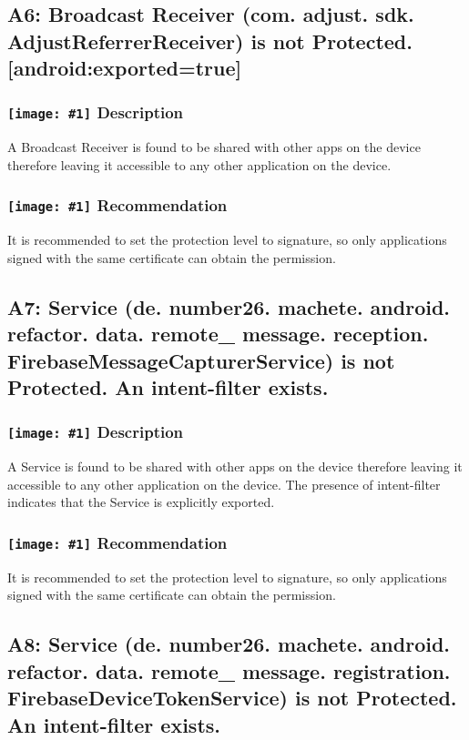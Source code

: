 \documentclass[12p]{article}
\newcommand{\icon}[1]{\texttt{[image: \#1]}}
\begin{document}
\subsection{A6: Broadcast Receiver (com. adjust. sdk. AdjustReferrerReceiver) is not Protected. [android:exported=true]}
\subsubsection*{\protect\icon{/home/miki/Documents/GITHUB/AndroidPermissions/python/vulns/report_icons/basic_sheet.png} Description}
A Broadcast Receiver is found to be shared with other apps on the device therefore leaving it accessible to any other application on the device.
\subsubsection*{\protect\icon{/home/miki/Documents/GITHUB/AndroidPermissions/python/vulns/report_icons/basic_todo.png} Recommendation}
It is recommended to set the protection level to signature, so only applications signed with the same certificate can obtain the permission.
\subsection{A7: Service (de. number26. machete. android. refactor. data. remote\_ message. reception. FirebaseMessageCapturerService) is not Protected. An intent-filter exists.}
\subsubsection*{\protect\icon{/home/miki/Documents/GITHUB/AndroidPermissions/python/vulns/report_icons/basic_sheet.png} Description}
A  Service is found to be shared with other apps on the device therefore leaving it accessible to any other application on the device. The presence of intent-filter indicates that the Service is explicitly exported.
\subsubsection*{\protect\icon{/home/miki/Documents/GITHUB/AndroidPermissions/python/vulns/report_icons/basic_todo.png} Recommendation}
It is recommended to set the protection level to signature, so only applications signed with the same certificate can obtain the permission.
\subsection{A8: Service (de. number26. machete. android. refactor. data. remote\_ message. registration. FirebaseDeviceTokenService) is not Protected. An intent-filter exists.}
\end{document}
